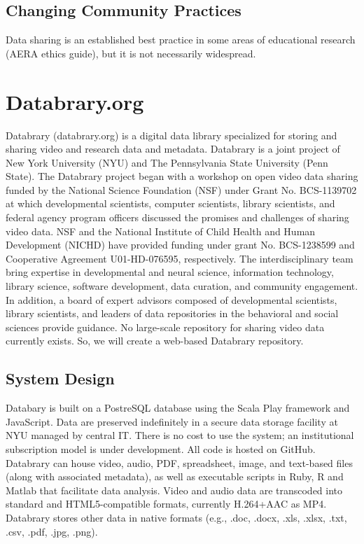 \documentclass[letterpaper,man,natbib]{apa6}
\begin{document}
\subsection{Changing Community Practices}
Data sharing is an established best practice in some areas of educational research (AERA ethics guide), but it is not necessarily widespread.
\section{Databrary.org}
Databrary (databrary.org) is a digital data library specialized for storing and sharing video and research data and metadata.
Databrary is a joint project of New York University (NYU) and The Pennsylvania State University (Penn State). 
The Databrary project began with a workshop on open video data sharing funded by the National
Science Foundation (NSF) under Grant No. BCS-1139702 at which developmental scientists, computer scientists, library scientists, and federal agency program officers discussed the promises and challenges of
sharing video data. 
NSF and the National Institute of Child Health and Human Development (NICHD) have provided funding under grant No. BCS-1238599 and Cooperative Agreement U01-HD-076595, respectively. 
The interdisciplinary team bring expertise in developmental and neural
science, information technology, library science, software development,
data curation, and community engagement. 
In addition, a board of expert
advisors composed of developmental scientists, library scientists, and
leaders of data repositories in the behavioral and social sciences
provide guidance.
No large-scale repository for sharing video data currently exists. So, we will create a web-based Databrary repository. 
\subsection{System Design}
Databary is built on a PostreSQL database using the Scala Play framework and JavaScript.
Data are preserved indefinitely in a secure data storage facility at NYU managed by central IT.
There is no cost to use the system; an institutional subscription model is under development.
All code is hosted on GitHub.
Databrary can house video, audio, PDF, spreadsheet, image, and text-based files (along with associated metadata), as well as executable scripts in Ruby, R and Matlab that facilitate data analysis.
Video and audio data are transcoded into standard and HTML5-compatible formats, currently H.264+AAC as MP4. Databrary stores other data in native formats (e.g., .doc, .docx, .xls, .xlsx, .txt, .csv, .pdf, .jpg, .png).
\end{document}
